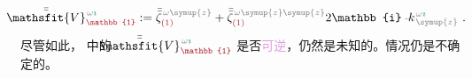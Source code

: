 \begin{align} \label{eq:plane_wave_basis-V1-nokxky}
	\Xint{\mathcolor{gray}{-}}{25}{\bar{\bar{\mathsfit{V}}}}^{\;\! \mathcolor{gray}{\omega} \textcolor{PineGreen}{\imath}}_{\textcolor{Maroon}{\mathbb{1}}} := \bar{\bar{\zeta}}^{\;\! \mathcolor{gray}{\omega} \mathcolor{gray}{\symup{z}}}_{\textcolor{Maroon}{(1)}} + \bar{\bar{\zeta}}^{\;\! \mathcolor{gray}{\omega} \mathcolor{gray}{\symup{z} \symup{z}}}_{\textcolor{Maroon}{(1)}} 2\mathbb{i} \Xint{\begin{smallmatrix} ~ \\ {}^{}_{\mathcolor{gray}{-}} \\ ~ \end{smallmatrix}}{15}{k}_{\;\! \mathcolor{gray}{\symup{z}}}^{\;\! \mathcolor{gray}{\omega} \textcolor{PineGreen}{\imath}} ~.
\end{align}
尽管如此， 中的 $\Xint{\mathcolor{gray}{-}}{25}{\bar{\bar{\mathsfit{V}}}}^{\;\! \mathcolor{gray}{\omega} \textcolor{PineGreen}{\imath}}_{\textcolor{Maroon}{\mathbb{1}}}$ 是否\textcolor{Plum}{可逆}，仍然是未知的。情况仍是不确定的。

